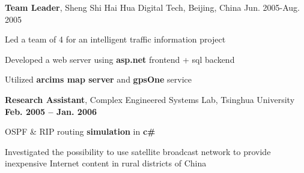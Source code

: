 \documentclass[overlapped, line]{resume}
\begin{document}
\begin{resume}
         {\bf Team Leader}, Sheng Shi Hai Hua Digital Tech, Beijing, China \hfill Jun. 2005-Aug. 2005\\
         \vspace{-10pt}      %
         \begin{list2}
         \item Led a team of 4 for an intelligent traffic information project
         \item Developed a web server using \textbf{asp.net} frontend + sql backend
         \item Utilized \textbf{arcims map server} and \textbf{gpsOne} service
         \end{list2}  \vspace{-5pt}

         {\bf Research Assistant}, Complex Engineered Systems Lab, Tsinghua University \hfill {\bf Feb. 2005 -- Jan. 2006}\\
         \vspace{-10pt}      %
         \begin{list2}
         \item OSPF \& RIP routing \textbf{simulation} in \textbf{c\#}
         \item Investigated the possibility to use satellite broadcast network to provide inexpensive Internet content in rural districts of China
         \end{list2}  \vspace{-5pt}



\end{resume}
\end{document}
